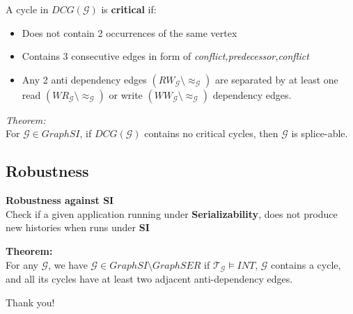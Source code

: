 \documentclass{beamer}
\begin{document}
\begin{frame}
A cycle in $DCG(\mathcal{G})$ is \textbf{critical} if:
\begin{itemize}
	\item Does not contain 2 occurrences of the same vertex
	\item Contains 3 consecutive edges in form of \textit{conflict,predecessor,conflict}
	\item Any 2 anti dependency edges $(RW_\mathcal{G}\setminus \approx_\mathcal{G})$ are separated by at least one read $(WR_\mathcal{G}\setminus \approx_\mathcal{G})$ or write $(WW_\mathcal{G}\setminus \approx_\mathcal{G})$ dependency edges.
\end{itemize}
\end{frame}

\begin{frame}
	\textit{Theorem:} \\
	For $\mathcal{G} \in GraphSI$, if $DCG(\mathcal{G})$ contains no critical cycles, then $\mathcal{G}$ is splice-able.
\end{frame}

\subsection{Robustness}

\begin{frame}
	\textbf{Robustness against SI} \\
	Check if a given application running under \textbf{Serializability}, does not produce new histories when runs under \textbf{SI}
\end{frame}


\begin{frame}
\textbf{Theorem:} \\
For any $\mathcal{G}$, we have $\mathcal{G} \in GraphSI \setminus GraphSER $ if $\mathcal{T}_\mathcal{G} \vDash INT$, $\mathcal{G}$ contains a cycle, and all its cycles have at least two adjacent anti-dependency edges.
\end{frame}

\begin{frame}
\begin{center}
	Thank you!
\end{center}
\end{frame}
\end{document}
